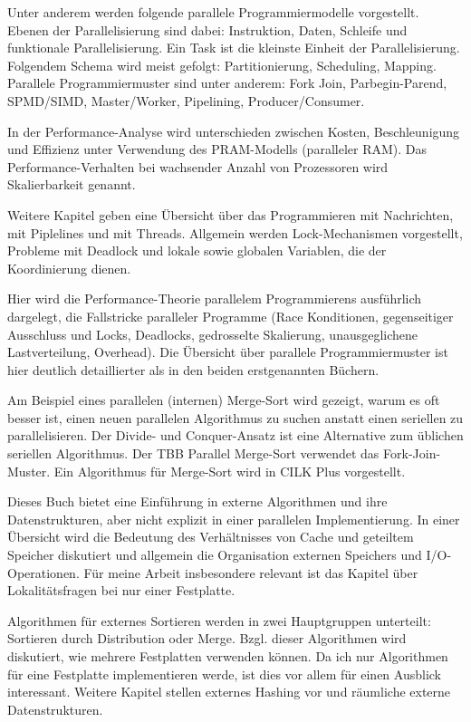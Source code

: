 \documentclass[a4paper,12pt,twoside]{article}
\begin{document}
Unter anderem werden folgende parallele Programmiermodelle vorgestellt. Ebenen der Parallelisierung sind dabei: Instruktion, Daten, Schleife und funktionale Parallelisierung. Ein Task ist die kleinste Einheit der Parallelisierung. Folgendem Schema wird meist gefolgt: Partitionierung, Scheduling, Mapping. Parallele Programmiermuster sind unter anderem: Fork Join, Parbegin-Parend, SPMD/SIMD, Master/Worker, Pipelining, Producer/Consumer.

In der Performance-Analyse wird unterschieden zwischen Kosten, Beschleunigung und Effizienz unter Verwendung des PRAM-Modells (paralleler RAM). Das Performance-Verhalten bei wachsender Anzahl von Prozessoren wird Skalierbarkeit genannt.

Weitere Kapitel geben eine Übersicht über das Programmieren mit Nachrichten, mit Piplelines und mit Threads. Allgemein werden Lock-Mechanismen vorgestellt, Probleme mit Deadlock und lokale sowie globalen Variablen, die der Koordinierung dienen.

\textbf{}

Hier wird die Performance-Theorie parallelem Programmierens ausführlich dargelegt, die Fallstricke paralleler Programme (Race Konditionen, gegenseitiger Ausschluss und Locks, Deadlocks, gedrosselte Skalierung, unausgeglichene Lastverteilung, Overhead). Die Übersicht über parallele Programmiermuster ist hier deutlich detaillierter als in den beiden erstgenannten Büchern.

Am Beispiel eines parallelen (internen) Merge-Sort wird gezeigt, warum es oft besser ist, einen neuen parallelen Algorithmus zu suchen anstatt einen seriellen zu parallelisieren. Der Divide- und Conquer-Ansatz ist eine Alternative zum üblichen seriellen Algorithmus. Der TBB Parallel Merge-Sort verwendet das Fork-Join-Muster. Ein Algorithmus für Merge-Sort wird in CILK Plus vorgestellt. 

\textbf{}

Dieses Buch bietet eine Einführung in externe Algorithmen und ihre Datenstrukturen, aber nicht explizit in einer parallelen Implementierung. In einer Übersicht wird die Bedeutung des Verhältnisses von Cache und geteiltem Speicher diskutiert und allgemein die Organisation externen Speichers und I/O-Operationen. Für meine Arbeit insbesondere relevant ist das Kapitel über Lokalitätsfragen bei nur einer Festplatte. 

Algorithmen für externes Sortieren werden in zwei Hauptgruppen unterteilt: Sortieren durch Distribution oder Merge. Bzgl. dieser Algorithmen wird diskutiert, wie mehrere Festplatten verwenden können. Da ich nur Algorithmen für eine Festplatte implementieren werde, ist dies vor allem für einen Ausblick interessant. Weitere Kapitel stellen externes Hashing vor und räumliche externe Datenstrukturen.
\end{document}
